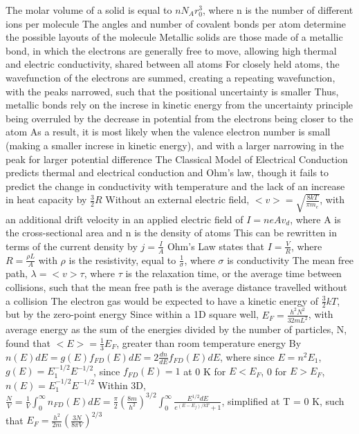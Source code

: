 \documentclass[11 pt, twoside]{article}
\newenvironment{outline*}
{
	\begin{outline}[enumerate]
	}
	{\end{outline}
}
\begin{document}
\begin{outline*}
		\3 The molar volume of a solid is equal to $nN_Ar_0^3$, where n is the number of different ions per molecule
		\3 The angles and number of covalent bonds per atom determine the possible layouts of the molecule
	\2 Metallic solids are those made of a metallic bond, in which the electrons are generally free to move, allowing high thermal and electric conductivity, shared between all atoms
		\3 For closely held atoms, the wavefunction of the electrons are summed, creating a repeating wavefunction, with the peaks narrowed, such that the positional uncertainty is smaller
		\3 Thus, metallic bonds rely on the increse in kinetic energy from the uncertainty principle being overruled by the decrease in potential from the electrons being closer to the atom
			\4 As a result, it is most likely when the valence electron number is small (making a smaller increse in kinetic energy), and with a larger narrowing in the peak for larger potential difference
\1 The Classical Model of Electrical Conduction predicts thermal and electrical conduction and Ohm's law, though it fails to predict the change in conductivity with temperature and the lack of an increase in heat capacity by $\frac{3}{2}R$
	\2 Without an external electric field, $<v> = \sqrt{\frac{8kT}{\pi m_e}}$, with an additional drift velocity in an applied electric field of $I = neAv_d$, where A is the cross-sectional area and n is the density of atoms
		\3 This can be rewritten in terms of the current density by $j = \frac{I}{A}$
		\3 Ohm's Law states that $I = \frac{V}{R}$, where $R = \frac{\rho L}{A}$ with $\rho$ is the resistivity, equal to $\frac{1}{\sigma}$, where $\sigma$ is conductivity
	\2 The mean free path, $\lambda = <v>\tau$, where $\tau$ is the relaxation time, or the average time between collisions, such that the mean free path is the average distance travelled without a collision
\1 The electron gas would be expected to have a kinetic energy of $\frac{3}{2}kT$, but by the zero-point energy
	\2 Since within a 1D square well, $E_F = \frac{h^2N^2}{32mL^2}$, with average energy as the sum of the energies divided by the number of particles, N, found that $<E> = \frac{1}{3}E_F$, greater than room temperature energy
		\3 By $n(E)dE = g(E)f_{FD}(E)dE = 2\frac{dn}{dE}f_{FD}(E)dE$, where since $E = n^2E_1$, $g(E) = E_1^{-1/2}E^{-1/2}$, since $f_{FD}(E) = 1$ at 0 K for $E < E_F$, 0 for $E > E_F$, $n(E) = E_1^{-1/2}E^{-1/2}$
	\2 Within 3D, $\frac{N}{V} = \frac{1}{V}\int^{\infty}_0 n_{FD}(E)dE = \frac{\pi}{2}(\frac{8m}{h^2})^{3/2}\int^{\infty}_0 \frac{E^{1/2}dE}{e^{(E - E_f)/kT} + 1}$, simplified at T = 0 K, such that $E_F = \frac{h^2}{2m}(\frac{3N}{8\pi V})^{2/3}$

\end{outline*}
\end{document}

